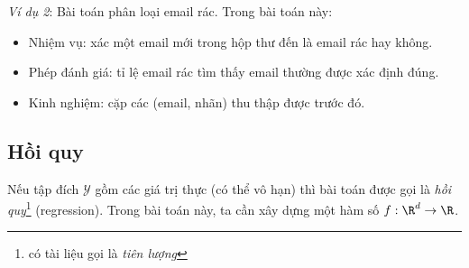 \textit{Ví dụ 2}: Bài toán phân loại email rác. Trong bài toán này:
\begin{itemize}
    \item Nhiệm vụ: xác một email mới trong hộp thư đến là email rác hay không.

    \item Phép đánh giá: tỉ lệ email rác tìm thấy email thường được xác định đúng.

    \item Kinh nghiệm: cặp các (email, nhãn) thu thập được trước đó.
\end{itemize}





\subsection{Hồi quy}
Nếu tập đích $\mathcal{Y}$ gồm các giá trị thực (có thể vô hạn)
thì bài toán được gọi là \textit{hồi quy}\footnote{có tài liệu gọi là
\textit{tiên lượng}} (regression). Trong bài toán này, ta cần xây dựng một hàm số $f: \R^d
\rightarrow \R$.

